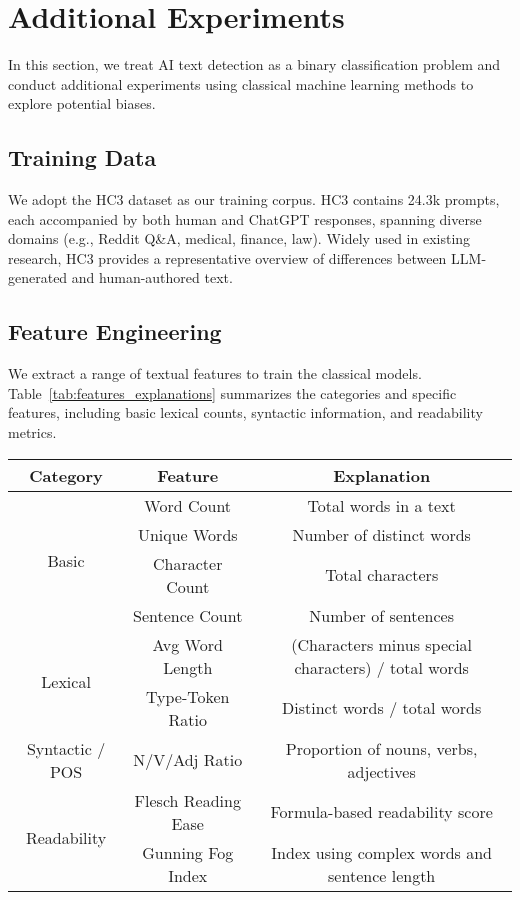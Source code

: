 \section{Additional Experiments}
In this section, we treat AI text detection as a binary classification problem and conduct additional experiments using classical machine learning methods to explore potential biases.

\subsection{Training Data}
We adopt the HC3 dataset \citep{guo2023closechatgpthumanexperts} as our training corpus. HC3 contains 24.3k prompts, each accompanied by both human and ChatGPT responses, spanning diverse domains (e.g., Reddit Q\&A, medical, finance, law). Widely used in existing research, HC3 provides a representative overview of differences between LLM-generated and human-authored text.

\subsection{Feature Engineering}
We extract a range of textual features to train the classical models. Table~\ref{tab:features_explanations} summarizes the categories and specific features, including basic lexical counts, syntactic information, and readability metrics.

\begin{table*}[h]
\small
\centering
\begin{tabular}{c|c|c}
\toprule
\textbf{Category} & \textbf{Feature} & \textbf{Explanation} \\
\midrule
\multirow{4}{*}{Basic}
 & Word Count         & Total words in a text \\
 & Unique Words       & Number of distinct words \\
 & Character Count    & Total characters \\
 & Sentence Count     & Number of sentences \\
\midrule
\multirow{2}{*}{Lexical}
 & Avg Word Length    & (Characters minus special characters) / total words \\
 & Type-Token Ratio   & Distinct words / total words \\
\midrule
Syntactic / POS
 & N/V/Adj Ratio      & Proportion of nouns, verbs, adjectives \\
\midrule
\multirow{2}{*}{Readability}
 & Flesch Reading Ease & Formula-based readability score \\
 & Gunning Fog Index   & Index using complex words and sentence length \\
\bottomrule
\end{tabular}
\caption{Features and their explanations.}
\label{tab:features_explanations}
\end{table*}

